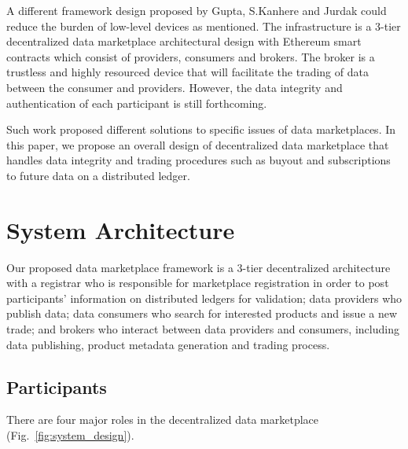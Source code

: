 \documentclass[conference]{IEEEtran}
\begin{document}
A different framework design proposed by Gupta, S.Kanhere and Jurdak\cite{3tierDataMarket} could reduce the burden of low-level devices as mentioned. The infrastructure is a 3-tier decentralized data marketplace architectural design with Ethereum smart contracts which consist of providers, consumers and brokers. The broker is a trustless and highly resourced device that will facilitate the trading of data between the consumer and providers. However, the data integrity and authentication of each participant is still forthcoming.

Such work proposed different solutions to specific issues of data marketplaces. In this paper, we propose an overall design of decentralized data marketplace that handles data integrity and trading procedures such as buyout and subscriptions to future data on a distributed ledger.

\section{System Architecture}
Our proposed data marketplace framework is a 3-tier decentralized architecture with a registrar who is responsible for marketplace registration in order to post participants' information on distributed ledgers for validation; data providers who publish data; data consumers who search for interested products and issue a new trade; and brokers who interact between data providers and consumers, including data publishing, product metadata generation and trading process.

\subsection{Participants}
There are four major roles in the decentralized data marketplace (Fig.~\ref{fig:system_design}).
\end{document}
